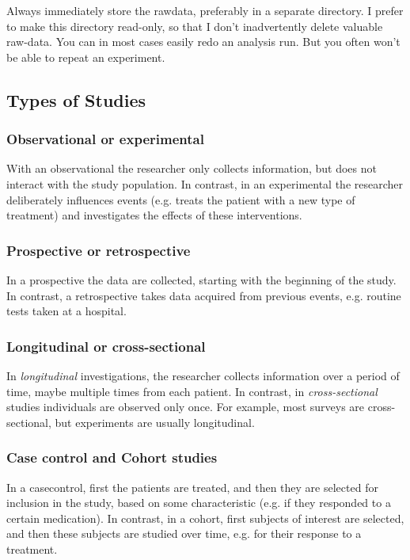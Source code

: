 Always immediately store the rawdata, preferably in a separate directory. I prefer to make this directory read-only, so that I don't inadvertently delete valuable raw-data. You can in most cases easily redo an analysis run. But you often won't be able to repeat an experiment.

\subsection{Types of Studies}

\subsubsection{Observational or experimental}
With an \gls{observational} the researcher only collects information, but does not interact with the study population. In contrast, in an \gls{experimental} the researcher deliberately influences events (e.g. treats the patient with a new type of treatment) and investigates the effects of these interventions.

\subsubsection{Prospective or retrospective}
In a \gls{prospective} the data are collected, starting with the beginning of the study. In contrast, a \gls{retrospective} takes data acquired from previous events, e.g. routine tests taken at a hospital.

\subsubsection{Longitudinal or cross-sectional}
In \emph{longitudinal} investigations, the researcher collects information over a period of time, maybe multiple times from each patient. In contrast, in \emph{cross-sectional} studies individuals are observed only once. For example, most surveys are cross-sectional, but experiments are usually longitudinal.

\subsubsection{Case control and Cohort studies}
In a \gls{casecontrol}, first the patients are treated, and then they are selected for inclusion in the study, based on some characteristic (e.g. if they responded to a certain medication). In contrast, in a \gls{cohort}, first subjects of interest are selected, and then these subjects are studied over time, e.g. for their response to a treatment.

